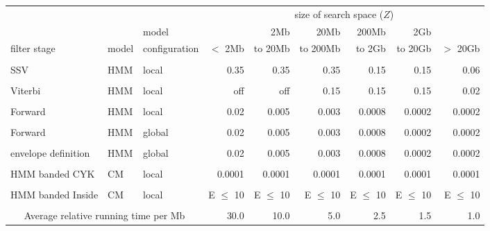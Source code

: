 %
\begin{center}
\begin{table}
\small
\begin{tabular}{lll|r|r|r|r|r|r|}
\multicolumn{3}{c}{} & \multicolumn{6}{|c|}{size of search space ($Z$)} \\ \cline{4-9}
               &      & model         &         & 2Mb     & 20Mb     & 200Mb  & 2Gb     &          \\
filter stage  & model & configuration & $<$ 2Mb & to 20Mb & to 200Mb & to 2Gb & to 20Gb & $>$ 20Gb \\  \hline
& & & & & & & & \\
SSV                 & HMM & local  & 0.35  & 0.35 & 0.35 & 0.15 & 0.15 & 0.06 \\
& & & & & & & & \\
Viterbi             & HMM & local  & off   & off & 0.15 & 0.15 & 0.15 & 0.02 \\
& & & & & & & & \\
Forward             & HMM & local  & 0.02  & 0.005 & 0.003 & 0.0008 & 0.0002 & 0.0002 \\
& & & & & & & & \\
Forward             & HMM & global & 0.02  & 0.005 & 0.003 & 0.0008 & 0.0002 & 0.0002 \\
& & & & & & & & \\
envelope definition & HMM & global & 0.02  & 0.005 & 0.003 & 0.0008 & 0.0002 & 0.0002 \\
& & & & & & & & \\
HMM banded CYK      & CM  & local  & 0.0001  & 0.0001  & 0.0001 & 0.0001 & 0.0001 & 0.0001 \\
& & & & & & & & \\
HMM banded Inside   & CM  & local  & E $\leq$ 10 & E $\leq$ 10 & E $\leq$ 10 & E $\leq$ 10 & E $\leq$ 10 & E $\leq$ 10 \\ \hline
& & & & & & & & \\
\multicolumn{3}{c|}{Average relative running time per Mb} & 30.0 & 10.0 & 5.0 & 2.5 & 1.5 & 1.0 \\
\end{tabular}

\end{table}
\end{center}
